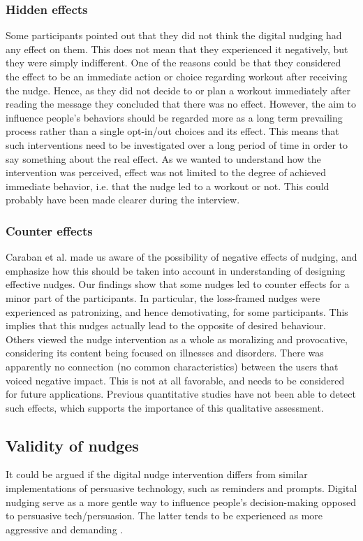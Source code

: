 \subsubsection{Hidden effects}
Some participants pointed out that they did not think the digital nudging had any effect on them. This does not mean that they experienced it negatively, but they were simply indifferent. One of the reasons could be that they considered the effect to be an immediate action or choice regarding workout after receiving the nudge. Hence, as they did not decide to or plan a workout immediately after reading the message they concluded that there was no effect. However, the aim to influence people's behaviors should be regarded more as a long term prevailing process rather than a single opt-in/out choices and its effect. This means that such interventions need to be investigated over a long period of time in order to say something about the real effect. As we wanted to understand how the intervention was perceived, effect was not limited to the degree of achieved immediate behavior, i.e. that the nudge led to a workout or not. This could probably have been made clearer during the interview.

\subsubsection{Counter effects}
Caraban et al. \cite{caraban_23_2019} made us aware of the possibility of negative effects of nudging, and emphasize how this should be taken into account in understanding of designing effective nudges. Our findings show that some nudges led to counter effects for a minor part of the participants. In particular, the loss-framed nudges were experienced as patronizing, and hence demotivating, for some participants. This implies that this nudges actually lead to the opposite of desired behaviour. Others viewed the nudge intervention as a whole as moralizing and provocative, considering its content being focused on illnesses and disorders. There was apparently no connection (no common characteristics) between the users that voiced negative impact. This is not at all favorable, and needs to be considered for future applications. Previous quantitative studies have not been able to detect such effects, which supports the importance of this qualitative assessment.   

\subsection{Validity of nudges}
It could be argued if the digital nudge intervention differs from similar implementations of persuasive technology, such as reminders and prompts. Digital nudging serve as a more gentle way to influence people's decision-making opposed to persuasive tech/persuasion. The latter tends to be experienced as more aggressive and demanding \cite{meske_status_2019}. 

